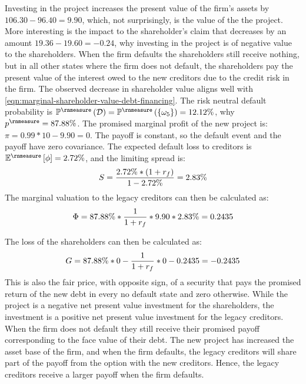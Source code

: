 \documentclass[main.tex]{subfiles}
\begin{document}
        Investing in the project increases the present value of the firm's assets by $106.30 - 96.40 = 9.90$, 
        which, not surprisingly, is the value of the the project.
        More interesting is the impact to the shareholder's claim that decreases by an amount $19.36 - 19.60 = -0.24$, 
        why investing in the project is of negative value to the shareholders.
        When the firm defaults the shareholders still receive nothing, 
        but in all other states where the firm does not default, 
        the shareholders pay the present value of the interest owed to the new creditors 
        due to the credit risk in the firm.
        The observed decrease in shareholder value aligns well with 
        \cref{eqn:marginal-shareholder-value-debt-financing}. 
        The risk neutral default probability is 
        $\mathbb{P}^{\rnmeasure}\left(\mathcal{D}\right) 
            = \mathbb{P}^{\rnmeasure}\left(\{\omega_{5}\}\right) 
            = 12.12\%$,
        why $p^{\rnmeasure} = 87.88\%$.
        The promised marginal profit of the new project is:
        $\pi = 0.99 * 10 - 9.90 = 0$.
        The payoff is constant, so the default event and the payoff have zero covariance. 
        The expected default loss to creditors is 
        $\mathbb{E}^{\rnmeasure}\left[\phi\right] = 2.72\%$,
        and the limiting spread is:
        \begin{equation}
            S 
            = \frac{
                2.72\% * (1 + r_{f})
            }{
                1 - 2.72\%
            } 
            = 2.83\%
        \end{equation}
        The marginal valuation to the legacy creditors can then be calculated as:
        \begin{equation}
            \Phi 
            = 87.88\% * \frac{1}{1+r_{f}}  * 9.90 * 2.83\% 
            = 0.2435
        \end{equation}

        The loss of the shareholders can then be calculated as: 
            \begin{align}
                G = 87.88\%*0 - \frac{1}{1+r_{f}} * 0 - 0.2435 = -0.2435
            \end{align}
        This is also the fair price, with opposite sign, 
        of a security that pays the promised return of the new debt in every no default state and zero otherwise. 
        While the project is a negative net present value investment for the shareholders,
        the investment is a positive net present value investment for the legacy creditors.
        When the firm does not default they still receive their promised payoff 
        corresponding to the face value of their debt.
        The new project has increased the asset base of the firm, and when the firm defaults, 
        the legacy creditors will share part of the payoff from the option with the new creditors.
        Hence, the legacy creditors receive a larger payoff when the firm defaults. 
\end{document}
